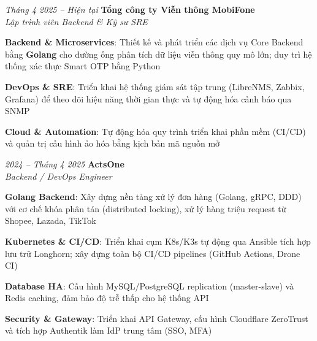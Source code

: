 \begin{twocolentry}{\textit{Tháng 4 2025 -- Hiện tại}}
    \textbf{Tổng công ty Viễn thông MobiFone} \\[4pt]
    \textit{Lập trình viên Backend \& Kỹ sư SRE}
\end{twocolentry}
\begin{onecolentry}
    \begin{highlights}
        \item \textbf{Backend \& Microservices}: Thiết kế và phát triển các dịch vụ Core Backend bằng \textbf{Golang} cho đường ống phân tích dữ liệu viễn thông quy mô lớn; duy trì hệ thống xác thực Smart OTP bằng Python
        \item \textbf{DevOps \& SRE}: Triển khai hệ thống giám sát tập trung (LibreNMS, Zabbix, Grafana) để theo dõi hiệu năng thời gian thực và tự động hóa cảnh báo qua SNMP
        \item \textbf{Cloud \& Automation}: Tự động hóa quy trình triển khai phần mềm (CI/CD) và quản trị cấu hình ảo hóa bằng kịch bản mã nguồn mở
    \end{highlights}
\end{onecolentry}
\vspace{0.2 cm}

\begin{twocolentry}{\textit{2024 -- Tháng 4 2025}}
    \textbf{ActsOne} \\[4pt]
    \textit{Backend / DevOps Engineer}
\end{twocolentry}
\begin{onecolentry}
    \begin{highlights}
        \item \textbf{Golang Backend}: Xây dựng nền tảng xử lý đơn hàng (Golang, gRPC, DDD) với cơ chế khóa phân tán (distributed locking), xử lý hàng triệu request từ Shopee, Lazada, TikTok
        \item \textbf{Kubernetes \& CI/CD}: Triển khai cụm K8s/K3s tự động qua Ansible tích hợp lưu trữ Longhorn; xây dựng toàn bộ CI/CD pipelines (GitHub Actions, Drone CI)
        \item \textbf{Database HA}: Cấu hình MySQL/PostgreSQL replication (master-slave) và Redis caching, đảm bảo độ trễ thấp cho hệ thống API
        \item \textbf{Security \& Gateway}: Triển khai API Gateway, cấu hình Cloudflare ZeroTrust và tích hợp Authentik làm IdP trung tâm (SSO, MFA)
    \end{highlights}
\end{onecolentry}
\vspace{0.2 cm}

